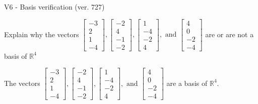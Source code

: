 \begin{exercise}
  \begin{exerciseTitle}V6 - Basis verification (ver. 727)\end{exerciseTitle}
  \begin{exerciseStatement}
    Explain why the vectors \(\left[\begin{array}{r}
-3 \\
2 \\
1 \\
-4
\end{array}\right] , \left[\begin{array}{r}
-2 \\
4 \\
-1 \\
-2
\end{array}\right] , \left[\begin{array}{r}
1 \\
-4 \\
-2 \\
4
\end{array}\right] , \text{ and } \left[\begin{array}{r}
4 \\
0 \\
-2 \\
-4
\end{array}\right]\) are or are not a basis of \(\mathbb{R}^4\)	


  \end{exerciseStatement}
  \begin{exerciseAnswer}
   The vectors \(\left[\begin{array}{r}
-3 \\
2 \\
1 \\
-4
\end{array}\right] , \left[\begin{array}{r}
-2 \\
4 \\
-1 \\
-2
\end{array}\right] , \left[\begin{array}{r}
1 \\
-4 \\
-2 \\
4
\end{array}\right] , \text{ and } \left[\begin{array}{r}
4 \\
0 \\
-2 \\
-4
\end{array}\right]\) 
  	 are  a basis of \(\mathbb{R}^4\).
  


  \end{exerciseAnswer}
\end{exercise}